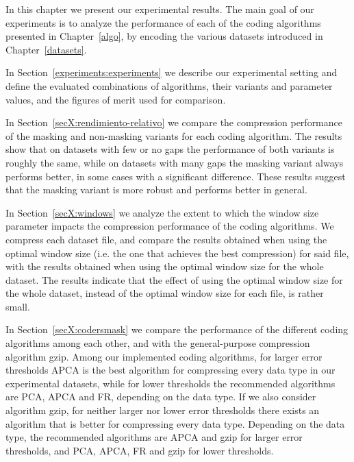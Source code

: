 
In this chapter we present our experimental results. The main goal of our experiments is to analyze the performance of each of the coding algorithms presented in Chapter~\ref{algo}, by encoding the various datasets introduced in Chapter~\ref{datasets}. 

In Section~\ref{experiments:experiments} we describe our experimental setting and define the evaluated combinations of algorithms, their variants and parameter values, and the figures of merit used for comparison. 

In Section~\ref{secX:rendimiento-relativo} we compare the compression performance of the masking and non-masking variants for each coding algorithm. The results show that on datasets with few or no gaps the performance of both variants is roughly the same, while on datasets with many gaps the masking variant always performs better, in some cases with a significant difference. These results suggest that the masking variant is more robust and performs better in general. 

In Section~\ref{secX:windows} we analyze the extent to which the window size parameter impacts the compression performance of the coding algorithms. We compress each dataset file, and compare the results obtained when using the optimal window size (i.e. the one that achieves the best compression) for said file, with the results obtained when using the optimal window size for the whole dataset. The results indicate that the effect of using the optimal window size for the whole dataset, instead of the optimal window size for each file, is rather small. 

In Section~\ref{secX:codersmask} we compare the performance of the different coding algorithms among each other, and with the general-purpose compression algorithm gzip. Among our implemented coding algorithms, for larger error thresholds APCA is the best algorithm for compressing every data type in our experimental datasets, while for lower thresholds the recommended algorithms are PCA, APCA and FR, depending on the data type. If we also consider algorithm gzip, for neither larger nor lower error thresholds there exists an algorithm that is better for compressing every data type. Depending on the data type, the recommended algorithms are APCA and gzip for larger error thresholds, and PCA, APCA, FR and gzip for lower thresholds.

